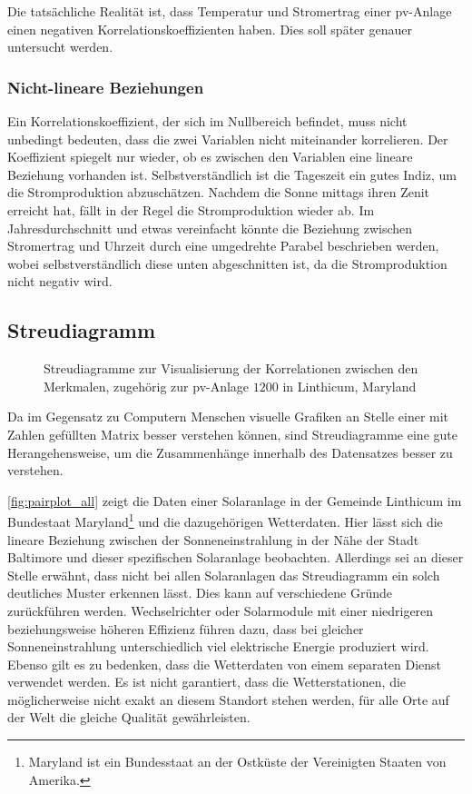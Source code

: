 \documentclass[12pt, a4paper]{article}
\begin{document}
Die tatsächliche Realität ist, dass Temperatur und Stromertrag einer \ac{pv}-Anlage einen negativen Korrelationskoeffizienten haben. Dies soll später genauer untersucht werden.

\subsubsection{Nicht-lineare Beziehungen}

Ein Korrelationskoeffizient, der sich im Nullbereich befindet, muss nicht unbedingt bedeuten, dass die zwei Variablen nicht miteinander korrelieren. Der Koeffizient spiegelt nur wieder, ob es zwischen den Variablen eine lineare Beziehung vorhanden ist. Selbstverständlich ist die Tageszeit ein gutes Indiz, um die Stromproduktion abzuschätzen. Nachdem die Sonne mittags ihren Zenit erreicht hat, fällt in der Regel die Stromproduktion wieder ab. Im Jahresdurchschnitt und etwas vereinfacht könnte die Beziehung zwischen Stromertrag und Uhrzeit durch eine umgedrehte Parabel beschrieben werden, wobei selbstverständlich diese unten abgeschnitten ist, da die Stromproduktion nicht negativ wird.

\subsection{Streudiagramm}

\begin{figure}
\centering
\def\svgwidth{450pt}

\caption{Streudiagramme zur Visualisierung der Korrelationen zwischen den Merkmalen, zugehörig zur \ac{pv}-Anlage $1200$ in Linthicum, Maryland}
\label{fig:pairplot_all}
\end {figure}

Da im Gegensatz zu Computern Menschen visuelle Grafiken an Stelle einer mit Zahlen gefüllten Matrix besser verstehen können, sind Streudiagramme eine gute Herangehensweise, um die Zusammenhänge innerhalb des Datensatzes besser zu verstehen.

\autoref{fig:pairplot_all} zeigt die Daten einer Solaranlage in der Gemeinde Linthicum im Bundestaat Maryland\footnote{Maryland ist ein Bundesstaat an der Ostküste der Vereinigten Staaten von Amerika.} und die dazugehörigen Wetterdaten. Hier lässt sich die lineare Beziehung zwischen der Sonneneinstrahlung in der Nähe der Stadt Baltimore und dieser spezifischen Solaranlage beobachten. Allerdings sei an dieser Stelle erwähnt, dass nicht bei allen Solaranlagen das Streudiagramm ein solch deutliches Muster erkennen lässt. Dies kann auf verschiedene Gründe zurückführen werden. Wechselrichter oder Solarmodule mit einer niedrigeren beziehungsweise höheren Effizienz führen dazu, dass bei gleicher Sonneneinstrahlung unterschiedlich viel elektrische Energie produziert wird. Ebenso gilt es zu bedenken, dass die Wetterdaten von einem separaten Dienst verwendet werden. Es ist nicht garantiert, dass die Wetterstationen, die möglicherweise nicht exakt an diesem Standort stehen werden, für alle Orte auf der Welt die gleiche Qualität gewährleisten.
\end{document}
